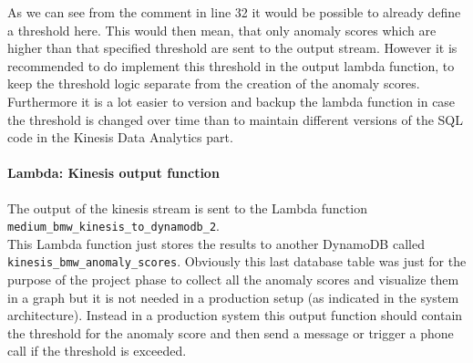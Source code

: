     \FloatBarrier
    As we can see from the comment in line 32 it would be possible to already define a threshold here. This would then mean, that only anomaly scores which are higher than that specified threshold are sent to the output stream. However it is recommended to do implement this threshold in the output lambda function, to keep the threshold logic separate from the creation of the anomaly scores. Furthermore it is a lot easier to version and backup the lambda function in case the threshold is changed over time than to maintain different versions of the SQL code in the Kinesis Data Analytics part.
    \paragraph{Lambda: Kinesis output function}
    The output of the kinesis stream is sent to the Lambda function \verb|medium_bmw_kinesis_to_dynamodb_2|. \\
    This Lambda function just stores the results to another DynamoDB called \verb|kinesis_bmw_anomaly_scores|. Obviously this last database table was just for the purpose of the project phase to collect all the anomaly scores and visualize them in a graph but it is not needed in a production setup (as indicated in the system architecture). Instead in a production system this output function should contain the threshold for the anomaly score and then send a message or trigger a phone call if the threshold is exceeded.
    
